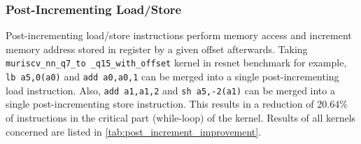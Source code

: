 \medskip
\begin{table}[h!]
    \centering
    \caption{Instructions reduction in critical part of each kernel with MAC }
    \label{tab:mac_improvement}
\end{table}


\subsubsection{Post-Incrementing Load/Store}
Post-incrementing load/store instructions perform memory access and increment memory address stored in register by a given offset afterwards. Taking \texttt{muriscv\_nn\_q7\_to \_q15\_with\_offset} kernel in resnet benchmark for example, \texttt{lb a5,0(a0)} and \texttt{add a0,a0,1} can be merged into a single post-incrementing load instruction. Also, \texttt{add a1,a1,2} and \texttt{sh a5,-2(a1)} can be merged into a single post-incrementing store instruction. This results in a reduction of 20.64\% of instructions in the critical part (while-loop) of the kernel. Results of all kernels concerned are listed in \cref{tab:post_increment_improvement}.

